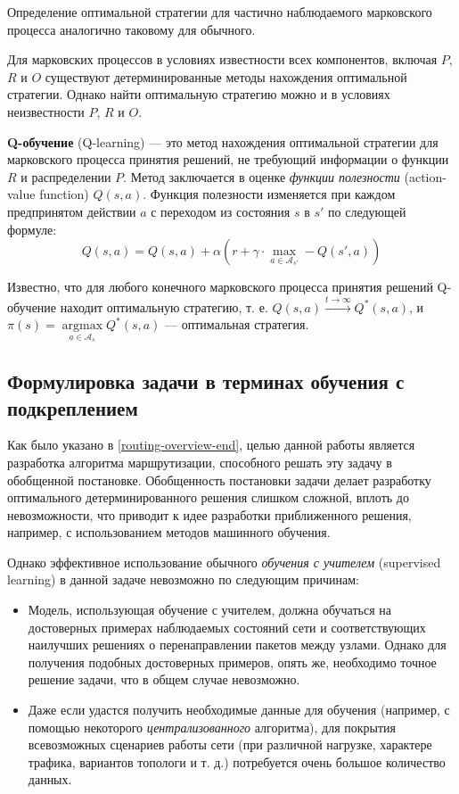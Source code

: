 \documentclass[specification, annotation]{itmo-student-thesis}
\DeclareMathOperator{\argmax}{argmax}
\begin{document}
Определение оптимальной стратегии для частично наблюдаемого марковского процесса
аналогично таковому для обычного.

Для марковских процессов в условиях известности всех компонентов, включая $P$,
$R$ и $O$ существуют детерминированные методы нахождения оптимальной стратегии.
Однако найти оптимальную стратегию можно и в условиях неизвестности $P$, $R$ и $O$.

\textbf{Q-обучение} (Q-learning) \cite{q-learning-orig} --- это метод нахождения
оптимальной стратегии для марковского процесса принятия решений, не требующий
информации о функции $R$ и распределении $P$. Метод заключается в оценке
\textit{функции полезности} (action-value function)
$Q(s,a)$. Функция полезности изменяется при каждом предпринятом действии $a$ с
переходом из состояния $s$ в $s'$ по следующей формуле:
\[
Q(s, a) = Q(s, a) + \alpha \left( r +
\gamma \cdot \max\limits_{a \in \mathcal{A}_{s'}} - Q(s', a) \right)
\]

Известно, что для любого конечного марковского процесса принятия решений
Q-обучение находит оптимальную стратегию, т. е. $Q(s, a) \xrightarrow{t
  \rightarrow \infty} Q^*(s, a)$, и $\pi(s) = \argmax\limits_{a \in
  \mathcal{A}_s} {Q^*(s, a)}$ --- оптимальная стратегия.

\subsection{Формулировка задачи в терминах обучения с подкреплением}\label{rl-task-formulation}

Как было указано в \ref{routing-overview-end}, целью данной работы является
разработка алгоритма маршрутизации, способного решать эту задачу в обобщенной
постановке. Обобщенность постановки задачи делает разработку оптимального
детерминированного решения слишком сложной, вплоть до невозможности, что
приводит к идее разработки приближенного решения, например, с использованием
методов машинного обучения.

Однако эффективное использование обычного \textit{обучения с учителем} (supervised
learning) в данной задаче невозможно по следующим причинам:

\begin{itemize}
  \item Модель, использующая обучение с учителем, должна обучаться на
    достоверных примерах наблюдаемых состояний сети и соответствующих наилучших
    решениях о перенаправлении пакетов между узлами. Однако для получения
    подобных достоверных примеров, опять же, необходимо точное решение задачи,
    что в общем случае невозможно.
  \item Даже если удастся получить необходимые данные для обучения (например,
    с помощью некоторого \textit{централизованного} алгоритма), для покрытия
    всевозможных сценариев работы сети (при различной нагрузке, характере
    трафика, вариантов топологи и т. д.) потребуется очень большое количество данных.
\end{itemize}
\end{document}
